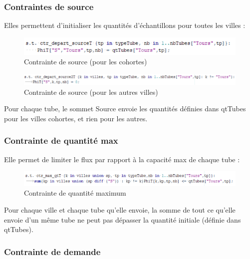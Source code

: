 \documentclass{polytech/polytech}
\numberwithin{figure}{chapter}
\begin{document}
\subsubsection{Contraintes de source}

Elles permettent d'initialiser les quantités d'échantillons pour toutes les villes : 

\begin{figure}[ht]
    \centering
    \includegraphics[width=\textwidth]{pic/source1.png}
    \caption{Contrainte de source (pour les cohortes)}
\end{figure}

\begin{figure}[ht]
    \centering
    \includegraphics[width=\textwidth]{pic/source2.png}
    \caption{Contrainte de source (pour les autres villes)}
\end{figure}

Pour chaque tube, le sommet Source envoie les quantités définies dans qtTubes pour les villes cohortes, et rien pour les autres.

\subsubsection{Contrainte de quantité max}

Elle permet de limiter le flux par rapport à la capacité max de chaque tube :

\begin{figure}[ht]
    \centering
    \includegraphics[width=\textwidth]{pic/maxqt.png}
    \caption{Contrainte de quantité maximum}
\end{figure}

Pour chaque ville et chaque tube qu'elle envoie, la somme de tout ce qu'elle envoie d'un même tube ne peut pas dépasser la quantité initiale (définie dans qtTubes).  

\subsubsection{Contrainte de demande}
\end{document}
